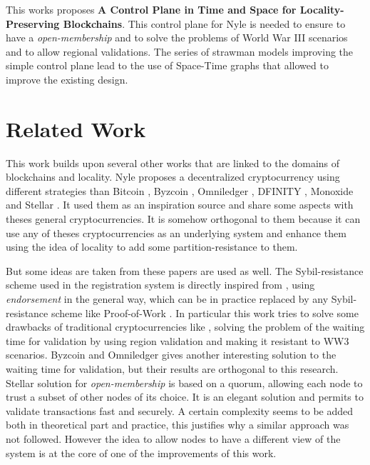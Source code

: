 \documentclass[a4paper,11pt,oneside]{report}
\begin{document}
This works proposes \textbf{A Control Plane in Time and Space for
Locality-Preserving Blockchains}. This control plane for Nyle is needed to
ensure to have a \textit{open-membership} and to solve the problems of World
War III scenarios and to allow regional validations. The series of strawman
models improving the simple control plane lead to the use of Space-Time graphs
that allowed to improve the existing design. 



\chapter{Related Work} \label{chap:RelatedWork}
This work builds upon several other works that are linked to the domains of
blockchains and locality. Nyle proposes a decentralized cryptocurrency using
different strategies than Bitcoin \cite{Nakamoto2009}, Byzcoin \cite{Kogias2016},
Omniledger \cite{Kokoris-Kogias2017}, DFINITY \cite{Hanke2018}, Monoxide
\cite{Wang2019} and Stellar \cite{Lokhava2019}. It used them as an inspiration
source and share some aspects with theses general cryptocurrencies.  It is
somehow orthogonal to them because it can use any of theses cryptocurrencies as
an underlying system and enhance them using the idea of locality to add some
partition-resistance to them. 

But some ideas are taken from these papers are used as well.  The
Sybil-resistance scheme used in the registration system is directly inspired
from \cite{Hanke2018}, using \textit{endorsement} in the general way, which can
be in practice replaced by any Sybil-resistance scheme like Proof-of-Work
\cite{Nakamoto2009}. In particular this work tries to solve some drawbacks of
traditional cryptocurrencies like \cite{Nakamoto2009}, solving the problem of
the waiting time for validation by using region validation and making it
resistant to WW3 scenarios. Byzcoin \cite{Kogias2016} and Omniledger
\cite{Kokoris-Kogias2017} gives another interesting solution to the waiting
time for validation, but their results are orthogonal to this research. Stellar
solution for \textit{open-membership} \cite{Lokhava2019} is based on a quorum,
allowing each node to trust a subset of other nodes of its choice. It is an
elegant solution and permits to validate transactions fast and securely. A
certain complexity seems to be added both in theoretical part and practice,
this justifies why  a similar approach was not followed. However the idea to
allow nodes to have a different view of the system is at the core of one of the
improvements of this work.
\end{document}
